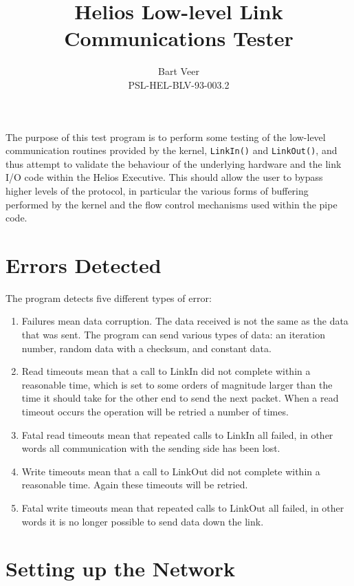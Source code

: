 \title{Helios Low-level Link Communications Tester}
\author{Bart Veer \\ PSL-HEL-BLV-93-003.2}

\maketitle

The purpose of this test program is to perform some testing of the
low-level communication routines provided by the kernel,
{\tt LinkIn()} and {\tt LinkOut()}, and thus attempt to validate the
behaviour of the underlying hardware and the link I/O code within
the Helios Executive. This should allow the user to bypass higher
levels of the protocol, in particular the various forms of buffering
performed by the kernel and the flow control mechanisms used within
the pipe code.

\section{Errors Detected}

The program detects five different types of error:

\begin{enumerate}
\item Failures mean data corruption. The data received is not the same as
the data that was sent. The program can send various types of data:
an iteration number, random data with a checksum, and constant data.
\item Read timeouts mean that a call to LinkIn did not complete within
a reasonable time, which is set to some orders of magnitude larger than
the time it should take for the other end to send the next packet. When
a read timeout occurs the operation will be retried a number of times.
\item Fatal read timeouts mean that repeated calls to LinkIn all
failed, in other words all communication with the sending side has been
lost.
\item Write timeouts mean that a call to LinkOut did not complete within
a reasonable time. Again these timeouts will be retried.
\item Fatal write timeouts mean that repeated calls to LinkOut all failed,
in other words it is no longer possible to send data down the link.
\end{enumerate}

\section{Setting up the Network}

